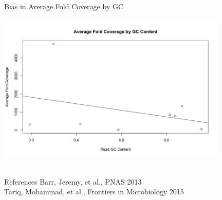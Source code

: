 \documentclass[11pt]{beamer}
\begin{document}
	
	\begin{frame}{Bias in Average Fold Coverage by GC}
	\includegraphics[height=8cm, width=11cm]{Viral_Coverage_by_GC.png}
	\end{frame}
	
	
	\begin{frame}{References}
	\tiny{ Barr, Jeremy, et al., PNAS 2013 \\ Tariq, Mohammad, et al., Frontiers in Microbiology 2015}
	\end{frame}
	
\end{document}
